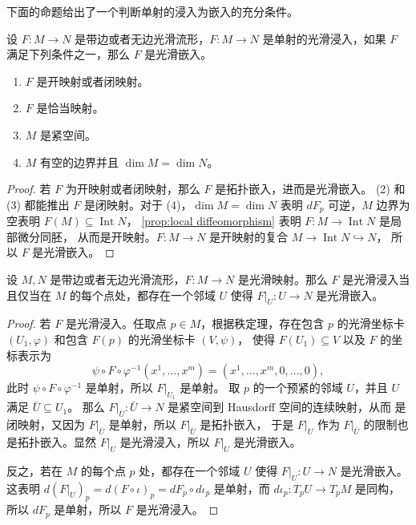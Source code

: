 \documentclass[fontset=none]{Notes}
\DeclareMathOperator\Int{Int}
\begin{document}
下面的命题给出了一个判断单射的浸入为嵌入的充分条件。

\begin{proposition}
  设 $F:M\to N$ 是带边或者无边光滑流形，$F:M\to N$ 是单射的光滑浸入，如果 $F$
  满足下列条件之一，那么 $F$ 是光滑嵌入。
  \begin{enumerate}
    \item $F$ 是开映射或者闭映射。
    \item $F$ 是恰当映射。
    \item $M$ 是紧空间。
    \item $M$ 有空的边界并且 $\dim M=\dim N$。
  \end{enumerate}
\end{proposition}
\begin{proof}
  若 $F$ 为开映射或者闭映射，那么 $F$ 是拓扑嵌入，进而是光滑嵌入。
  (2) 和 (3) 都能推出 $F$ 是闭映射。对于 (4)，$\dim M=\dim N$ 表明
  $dF_p$ 可逆，$M$ 边界为空表明 $F(M)\subseteq\Int N$，
  \autoref{prop:local diffeomorphism} 表明 $F:M\to\Int N$ 是局部微分同胚，
  从而是开映射。$F:M\to N$ 是开映射的复合 $M\to\Int N\hookrightarrow N$，
  所以 $F$ 是光滑嵌入。
\end{proof}

\begin{theorem}[局部嵌入定理]\label{thm:local embedding}
  设 $M,N$ 是带边或者无边光滑流形，$F:M\to N$ 是光滑映射。那么 $F$
  是光滑浸入当且仅当在 $M$ 的每个点处，都存在一个邻域 $U$ 使得
  $F|_U:U\to N$ 是光滑嵌入。
\end{theorem}
\begin{proof}
  若 $F$ 是光滑浸入。任取点 $p\in M$，根据秩定理，存在包含 $p$
  的光滑坐标卡 $(U_1,\varphi)$ 和包含 $F(p)$ 的光滑坐标卡 $(V,\psi)$，
  使得 $F(U_1)\subseteq V$ 以及 $F$ 的坐标表示为
  \[
    \psi\circ F\circ\varphi^{-1}\left(x^1,\dots,x^m\right)=
    \left(x^1,\dots,x^m,0,\dots,0\right),
  \]
  此时 $\psi\circ F\circ\varphi^{-1}$ 是单射，所以 $F|_{U_1}$ 是单射。
  取 $p$ 的一个预紧的邻域 $U$，并且 $U$ 满足 $\bar U\subseteq U_1$。
  那么 $F|_{\bar U}:\bar U\to N$ 是紧空间到 Hausdorff 空间的连续映射，从而
  是闭映射，又因为 $F|_{\bar U}$ 是单射，所以 $F|_{\bar U}$ 是拓扑嵌入，
  于是 $F|_U$ 作为 $F|_{\bar U}$ 的限制也是拓扑嵌入。显然 $F|_U$
  是光滑浸入，所以 $F|_U$ 是光滑嵌入。

  反之，若在 $M$ 的每个点 $p$ 处，都存在一个邻域 $U$ 使得 $F|_U:U\to N$ 是光滑嵌入。
  这表明 $d(F|_U)_p=d(F\circ\iota)_p=dF_{p}\circ d\iota_p$ 是单射，而
  $d\iota_p:T_pU\to T_pM$ 是同构，所以 $dF_p$ 是单射，所以 $F$ 是光滑浸入。 
\end{proof}
\end{document}
